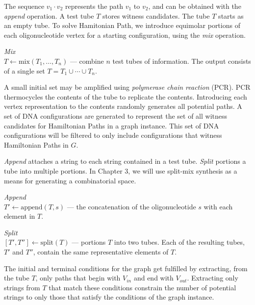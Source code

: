 The sequence $v_1 \cdot v_2$ represents the path $v_1$ to $v_2$, and can be obtained with the \textit{append} operation.  A test tube $T$ stores witness candidates.  The tube $T$ starts as an empty tube.  To solve {\sc Hamitonian Path}, we introduce equimolar portions of each oligonucleotide vertex for a starting configuration, using the \textit{mix} operation.

\begin{definition}
\textit{Mix}\\
$ T \leftarrow \text{mix}( T_1, \ldots , T_n)$ --- combine $n$ test tubes of information.  The output consists of a single set $T = T_1 \cup \cdots \cup T_n$.
\end{definition}

A small initial set may be amplified using \textit{polymerase chain reaction} (PCR).  PCR thermocycles the contents of the tube to replicate the contents.  Introducing each vertex representation to the contents randomly generates all potential paths.  A set of DNA configurations are generated to represent the set of all witness candidates for Hamiltonian Paths in a graph instance.  This set of DNA configurations will be filtered to only include configurations that witness Hamiltonian Paths in $G$.

\textit{Append} attaches a string to each string contained in a test tube.  \textit{Split} portions a tube into multiple portions.  In Chapter 3, we will use split-mix synthesis as a means for generating a combinatorial space.

\begin{definition}
\textit{Append}\\
$T' \leftarrow \text{append}( T, s)$ --- the concatenation of the oligonucleotide $s$ with each element in $T$.  
\end{definition}

\begin{definition}
\textit{Split}\\
$[T', T''] \leftarrow \text{split}( T)$ --- portions $T$ into two tubes.  Each of the resulting tubes, $T'$ and $T''$,  contain the same representative elements of $T$.
\end{definition}

The initial and terminal conditions for the graph get fulfilled by extracting, from the tube $T$, only paths that begin with $V_{in}$ and end with $V_{out}$.  Extracting only strings from $T$ that match these conditions constrain the number of potential strings to only those that satisfy the conditions of the graph instance.

